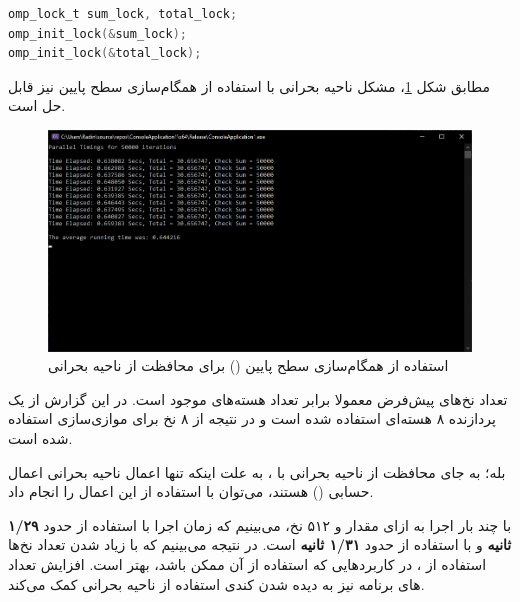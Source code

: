 \documentclass{HW}
\begin{document}
\begin{latin}
\begin{minipage}{\linewidth}
\begin{lstlisting}[language=C]
omp_lock_t sum_lock, total_lock;
omp_init_lock(&sum_lock);
omp_init_lock(&total_lock);
\end{lstlisting}
\end{minipage}
\end{latin}

مطابق شکل
\ref{fig:parallel-lock}،
مشکل ناحیه بحرانی با استفاده از همگام‌سازی سطح پایین نیز قابل حل است.

\begin{figure}[ht!]
\begin{center}
	\includegraphics[width=15cm]{images/parallel-lock}
\end{center}
\caption{استفاده از همگام‌سازی سطح پایین () برای محافظت از ناحیه بحرانی}
\label{fig:parallel-lock}
\end{figure}

\setcounter{mynumber}{1}
\begin{question}
تعداد نخ‌های پیش‌فرض  معمولا برابر تعداد هسته‌های موجود است. در این گزارش از یک پردازنده ۸ هسته‌ای استفاده شده است و در نتیجه از ۸ نخ برای موازی‌سازی استفاده شده است.
\end{question}

\begin{question}
بله؛ به جای محافظت از ناحیه بحرانی با ، به علت اینکه تنها اعمال ناحیه بحرانی اعمال حسابی () هستند، می‌توان با استفاده از  این اعمال را انجام داد.
\end{question}

\begin{question}
با چند بار اجرا به ازای مقدار  و ۵۱۲ نخ، می‌بینیم که زمان اجرا با استفاده از  حدود
\textbf{۱/۲۹ ثانیه}
و با استفاده از  حدود
\textbf{۱/۳۱ ثانیه}
است. در نتیجه می‌بینیم که با زیاد شدن تعداد نخ‌ها استفاده از ، در کاربردهایی که استفاده از آن ممکن باشد، بهتر است. افزایش تعداد های برنامه نیز به دیده شدن کندی استفاده از ناحیه بحرانی کمک می‌کند.
\end{question}
\end{document}
